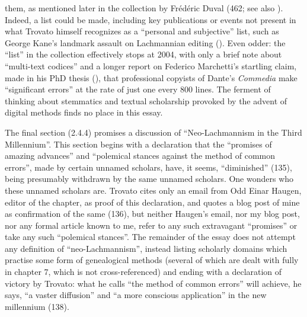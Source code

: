 \documentclass{article}
\begin{document}
them, as mentioned later in the collection by Frédéric Duval (462; see
also \cite{pugliatti_textual_1998}). Indeed, a list could be made, including key
publications or events not present in what Trovato himself recognizes as
a ``personal and subjective'' list, such as George Kane's landmark
assault on Lachmannian editing (\citeyear{kane_john_1984}). Even odder: the ``list'' in the
collection effectively stops at 2004, with only a brief note about
``multi-text codices'' and a longer report on Federico Marchetti's
startling claim, made in his PhD thesis (\citeyear{marchetti_scribal_2019}), that professional
copyists of Dante's \emph{Commedia} make ``significant errors'' at the
rate of just one every 800 lines. The ferment of thinking about
stemmatics and textual scholarship provoked by the advent of digital
methods finds no place in this essay.

The final section (2.4.4) promises a discussion of
``Neo-Lachmannism in the Third Millennium''. This section begins with a
declaration that the ``promises of amazing advances'' and ``polemical
stances against the method of common errors'', made by certain unnamed
scholars, have, it seems, ``diminished'' (135), being presumably
withdrawn by the same unnamed scholars. One wonders who these unnamed
scholars are. Trovato cites only an email from Odd Einar Haugen, editor
of the chapter, as proof of this declaration, and quotes a blog post of
mine as confirmation of the same (136), but neither Haugen's email, nor
my blog post, nor any formal article known to me, refer to any such
extravagant ``promises'' or take any such ``polemical stances''. The
remainder of the essay does not attempt any definition of
``neo-Lachmannism'', instead listing scholarly domains which practise
some form of genealogical methods (several of which are dealt with fully
in chapter 7, which is not cross-referenced) and ending with a
declaration of victory by Trovato: what he calls ``the method of common
errors'' will achieve, he says, ``a vaster diffusion'' and ``a more
conscious application'' in the new millennium (138).
\end{document}
